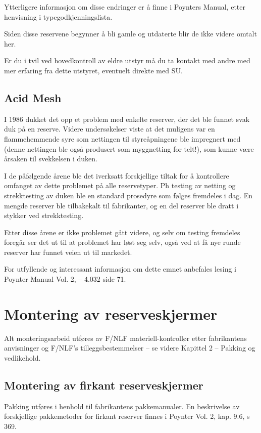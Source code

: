 Ytterligere informasjon om disse endringer er å finne i Poynters Manual, etter henvisning i typegodkjenningslista.

Siden disse reservene begynner å bli gamle og utdaterte blir de ikke videre omtalt her.

Er du i tvil ved hovedkontroll av eldre utstyr må du ta kontakt med andre med mer erfaring fra dette utstyret, eventuelt direkte med SU.

\subsection{Acid Mesh}
I 1986 dukket det opp et problem med enkelte reserver, der det ble funnet svak duk på en reserve. Videre undersøkelser viste at det muligens var en flammehemmende syre som nettingen til styreåpningene ble impregnert med (denne nettingen ble også produsert som myggnetting for telt!), som kunne være årsaken til svekkelsen i duken.

I de påfølgende årene ble det iverksatt forskjellige tiltak for å kontrollere omfanget av dette problemet på alle reservetyper. Ph testing av netting og strekktesting av duken ble en standard prosedyre som følges fremdeles i dag. En mengde reserver ble tilbakekalt til fabrikanter, og en del reserver ble dratt i stykker ved strekktesting.

Etter disse årene er ikke problemet gått videre, og selv om testing fremdeles foregår ser det ut til at problemet har løst seg selv, også ved at få nye runde reserver har funnet veien ut til markedet.

For utfyllende og interessant informasjon om dette emnet anbefales lesing i Poynter Manual Vol. 2, – 4.032 side 71.

\section{Montering av reserveskjermer}
Alt monteringsarbeid utføres av F/NLF materiell-kontrollør etter fabrikantens anvisninger og F/NLF’s tilleggsbestemmelser – se videre Kapittel 2 – Pakking og vedlikehold.

\subsection{Montering av firkant reserveskjermer}
Pakking utføres i henhold til fabrikantens pakkemanualer. En beskrivelse av forskjellige pakkemetoder for firkant reserver finnes i Poynter Vol. 2, kap. 9.6, s 369.


